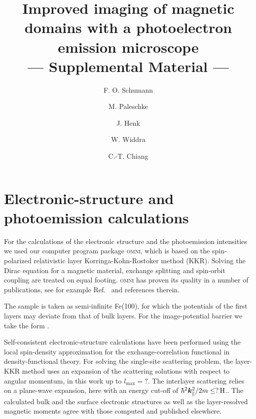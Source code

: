 \documentclass[amsfonts, amssymb, amsmath, preprint, showkeys, nofootinbib, twoside, prl]{revtex4-2}
\renewcommand{\vec}[1]{\boldsymbol{#1}}
\begin{document}
\title{Improved imaging of magnetic domains with a photoelectron emission microscope \\ --- Supplemental Material ---}

\author{F. O. Schumann}

\author{M. Paleschke}
\author{J. Henk}
\author{W. Widdra}

\author{C.-T. Chiang}

\maketitle

\section{Electronic-structure and photoemission calculations}
For the calculations of the electronic structure and the photoemission intensities we used our computer program package \textsc{omni}, which is based on the spin-polarized relativistic layer Korringa-Kohn-Rostoker method (KKR). Solving the Dirac equation for a magnetic material, exchange splitting and spin-orbit coupling are treated on equal footing. \textsc{omni} has proven its quality in a number of publications, see for example Ref.~\cite{Tusche2018} and references therein.

The sample is taken as semi-infinite Fe(100), for which the potentials of the first  layers may deviate from that of bulk layers.  For the image-potential barrier we take the  form .

Self-consistent electronic-structure calculations have been performed using the local spin-density approximation for the exchange-correlation functional in density-functional theory. For solving the single-site scattering problem, the layer-KKR method uses an expansion of the scattering solutions with respect to angular momentum, in this work up to $l_{\mathrm{max}} = ?$. The interlayer scattering relies on a  plane-wave expansion, here with an energy cut-off of $\hbar^{2}\vec{k}_{\parallel}^{2} / 2 m \leq \unit[?]{H}$.. The calculated bulk and the surface electronic structures as well as the layer-resolved magnetic moments agree with those computed and published elsewhere. 
\end{document}
